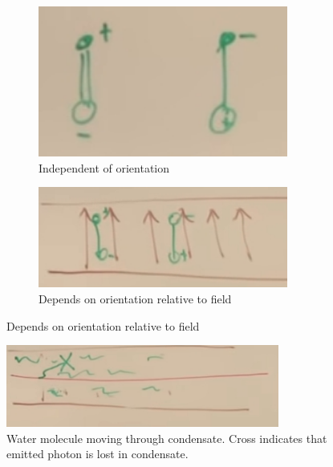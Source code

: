 \documentclass[]{article}
\begin{document}
\begin{figure}[H]
	\begin{center}
		\caption{Analogy: the water molecule and its mass}\label{fig:2-a2-water-molecule}
		\begin{subfigure}[t]{0.4\textwidth}
			\caption{Independent of orientation}
			\includegraphics[width=0.9\textwidth]{2-a2-water-molecule}
		\end{subfigure}
		\begin{subfigure}[t]{0.4\textwidth}
			\caption{Depends on orientation relative to field}\label{fig:2-a2-water-molecule-in-field}
			\includegraphics[width=0.9\textwidth]{2-a2-water-molecule-in-field}
		\end{subfigure}

	\end{center}
\end{figure}

\begin{figure}[h]
	\begin{center}
		\caption[Water molecule moving through condensate.]{Water molecule moving through condensate. Cross indicates that emitted photon is lost in condensate.}\label{fig:2-a2-water-molecule-in-condensate}
		\includegraphics[width=0.8\textwidth]{2-a2-water-molecule-in-condensate}
	\end{center}
\end{figure}
\end{document}
